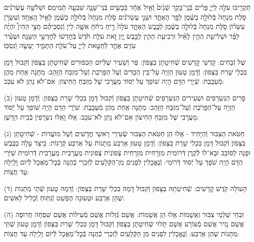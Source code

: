 \documentclass[twoside, openany, parskip=half, 11pt]{book}
\begin{document}
תַּקְרִ֥יבוּ עֹלָ֖ה לַייָ֑ פָּרִ֨ים בְּֿנֵֽי־בָקָ֤ר שְֿׁנַ֙יִם֙ וְֿאַ֣יִל אֶחָ֔ד כְּֿבָשִׂ֧ים בְּֿנֵי־שָׁנָ֛ה שִׁבְעָ֖ה תְּֿמִימִֽם׃
וּשְׁלֹשָׁ֣ה עֶשְׂרֹנִ֗ים סֹ֤לֶת מִנְחָה֙ בְּֿלוּלָ֣ה בַשֶּׁ֔מֶן לַפָּ֖ר הָאֶחָ֑ד וּשְׁנֵ֣י עֶשְׂרֹנִ֗ים סֹ֤לֶת מִנְחָה֙ בְּֿלוּלָ֣ה בַשֶּׁ֔מֶן לָאַ֖יִל הָֽאֶחָֽד׃
וְֿעִשָּׂרֹ֣ן עִשָּׂר֗וֹן סֹ֤לֶת מִנְחָה֙ בְּֿלוּלָ֣ה בַשֶּׁ֔מֶן לַכֶּ֖בֶשׂ הָאֶחָ֑ד עֹלָה֙ רֵ֣יחַ נִיחֹ֔חַ אִשֶּׁ֖ה לַייָ׃
וְֿנִסְכֵּיהֶ֗ם חֲצִ֣י הַהִין֩ יִהְיֶ֨ה לַפָּ֜ר וּשְׁלִישִׁ֧ת הַהִ֣ין לָאַ֗יִל וּרְבִיעִ֥ת הַהִ֛ין לַכֶּ֖בֶשׂ יָ֑יִן זֹ֣את עֹלַ֥ת חֹ֙דֶשׁ֙ בְּֿחׇדְשׁ֔וֹ לְֿחׇדְשֵׁ֖י הַשָּׁנָֽה׃
וּשְׂעִ֨יר עִזִּ֥ים אֶחָ֛ד לְֿחַטָּ֖את לַייָ֑ עַל־עֹלַ֧ת הַתָּמִ֛יד יֵעָשֶׂ֖ה וְֿנִסְכּֽוֹ׃

%
שֶׁל זְֿבָחִים: קׇדְשֵׁי קׇדָשִׁים שְֿׁחִיטָתָן בַּצָּפוֹן: פָּר וְֿשָׂעִיר שֶׁלְּֿיוֹם הַכִּפּוּרִים שְֿׁחִיטָתָן בַּצָּפוֹן וְֿקִבּוּל דָּמָן בִּכְלֵי שָׁרֵת בַּצָּפוֹן: וְֿדָמָן טָעוּן הַזָּיָה עַל־בֵּין הַבַּדִּים וְֿעַל הַפָּרֹֽכֶת וְֿעַל־מִזְבַּח הַזָּהָב: מַתָּנָה אַֽחַת מֵהֶן מְֿעַכָּֽבֶת: שְֿׁיָרֵי הַדָּם הָיָה שׁוֹפֵךְ עַל יְֿסוֹד מַעֲרָבִי שֶׁל מִזְבֵּחַ הַחִיצוֹן: אִם־לֹא נָתַן לֹא עִכֵּב:

(ב) פָּרִים הַנִּשְׂרָפִים וּשְׂעִירִים הַנִּשְׂרָפִים שְֿׁחִיטָתָן בַּצָּפוֹן וְֿקִבּוּל דָּמָן בִּכְלִי שָׁרֵת בַּצָּפוֹן: וְֿדָמָן טָעוּן הַזָּיָה עַל־הַפָּרֹֽכֶת וְֿעַל־מִזְבַּח הַזָּהָב: מַתָּנָה אַֽחַת מֵהֶן מְֿעַכָּֽבֶת: שִׁיְֿרֵי הַדָּם הָיָה שׁוֹפֵךְ עַל יְֿסוֹד מַעֲרָבִי שֶׁל מִזְבֵּחַ הַחִיצוֹן אִם־לֹא נָתַן לֹא־עִכֵּב: אֵֽלּוּ וָאֵֽלּוּ נִשְׂרָפִין בְּֿבֵית הַדָּשֶׁן:

(ג) חַטֹּאת הַצִּבּוּר וְֿהַיָּחִיד - אֵֽלּוּ הֵן חַטֹּאת הַצִּבּוּר שְֿׂעִירֵי רָאשֵׁי חֳדָשִׁים וְֿשֶׁל מוׁעֲדוׂת - שְֿׁחִיטָתָן בַּצָּפוֹן וְֿקִבּוּל דָּמָן בִּכְלִי שָׁרֵת בַּצָּפוֹן: וְֿדָמָן טָעוּן אַרְבַּע מַתָּנוֹת עַל אַרְבַּע קְֿרָנוֹת: כֵּיצַד עָלָה בַכֶּֽבֶשׁ וּפָנָה לַסּוֹבֵב וּבָא־לוֹ לְֿקֶֽרֶן דְּֿרוֹמִית מִזְרָחִית מִזְרָחִית צְֿפוֹנִית צְֿפוֹנִית מַעֲרָבִית מַעֲרָבִית דְּֿרוֹמִית שִׁיְּֿרֵי הַדָּם הָיָה שֹׁפֵךְ עַל יְֿסוֹד דְּֿרוֹמִי: וְֿנֶאֱכָלִין לִפְנִים מִן־הַקְּֿלָעִים לְֿזִכְרֵי כְֿהֻנָּה בְּֿכׇל־מַאֲכָל לְֿיוֹם וָלַֽיְלָה עַד חֲצוֹת:

(ד) הָעוֹלָה קֹֽדֶשׁ קׇדָשִׁים: שְֿׁחִיטָתָהּ בַּצָּפוֹן וְֿקִבּוּל דָּמָהּ בִּכְלִי שָׁרֵת בַּצָּפוֹן: וְֿדָמָהּ טָעוּן שְֿׁתֵּי מַתָּנוֹת שֶׁהֵן אַרְבַּע וּטְעוּנָה הֶפְשֵׁט וְֿנִתּֽוּחַ וְֿכָלִיל לָאִשִּׁים:

(ה) זִבְחֵי שַׁלְמֵי צִבּוּר וַאֲשָׁמוֹת אֵֽלוּ הֵן אֲשָׁמוֹת: אֲשַׁם גְּֿזֵלוֹת אֲשַׁם מְֿעִילוֹת אֲשַׁם שִׁפְחָה חֲרוּפָה אֲשַׁם נָזִיר אֲשַׁם מְֿצוֹרָע אָשָׁם תָּלוּי שְֿׁחִיטָתָן בַּצָּפוֹן וְֿקִבּוּל דָּמָן בִּכְלִי שָׁרֵת בַּצָּפוֹן וְֿדָמָן טָעוּן שְֿׁתֵּי מַתָּנוֹת שֶׁהֵן אַרְבַּע: וְֿנֶאֱכָלִין לִפְנִים מִן הַקְּֿלָעִים לְֿזִכְרֵי כְֿהֻנָּה בְּֿכׇל־מַאֲכָל לְֿיוֹם וָלַֽיְלָה עַד חֲצוֹת:
\end{document}
